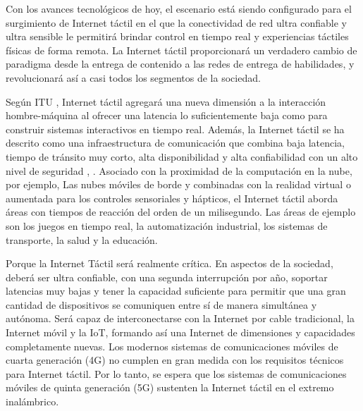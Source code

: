 \documentclass[12pt,journal,compsoc]{IEEEtran}
\begin{document}
Con los avances tecnológicos de hoy, el escenario está siendo configurado para el surgimiento de Internet táctil en el que la conectividad de red ultra confiable y ultra sensible le permitirá brindar control en tiempo real y experiencias táctiles físicas de forma remota. La Internet táctil proporcionará un verdadero cambio de paradigma desde la entrega de contenido a las redes de entrega de habilidades, y revolucionará así a casi todos los segmentos de la sociedad. 

Según ITU \cite{2}, Internet táctil agregará una nueva dimensión a la interacción hombre-máquina al ofrecer una latencia lo suficientemente baja como para construir sistemas interactivos en tiempo real. Además, la Internet táctil se ha descrito como una infraestructura de comunicación que combina baja latencia, tiempo de tránsito muy corto, alta disponibilidad y alta confiabilidad con un alto nivel de seguridad \cite{3}, \cite{4}. Asociado con la proximidad de la computación en la nube, por ejemplo, Las nubes móviles de borde y combinadas con la realidad virtual o aumentada para los controles sensoriales y hápticos, el Internet táctil aborda áreas con tiempos de reacción del orden de un milisegundo. Las áreas de ejemplo son los juegos en tiempo real, la automatización industrial, los sistemas de transporte, la salud y la educación.

Porque la Internet Táctil será realmente crítica. En aspectos de la sociedad, deberá ser ultra confiable, con una segunda interrupción por año, soportar latencias muy bajas y tener la capacidad suficiente para permitir que una gran cantidad de dispositivos se comuniquen entre sí de manera simultánea y autónoma. Será capaz de interconectarse con la Internet por cable tradicional, la Internet móvil y la IoT, formando así una Internet de dimensiones y capacidades completamente nuevas. Los modernos sistemas de comunicaciones móviles de cuarta generación (4G) no cumplen en gran medida con los requisitos técnicos para Internet táctil. Por lo tanto, se espera que los sistemas de comunicaciones móviles de quinta generación (5G) sustenten la Internet táctil en el extremo inalámbrico.
\end{document}
